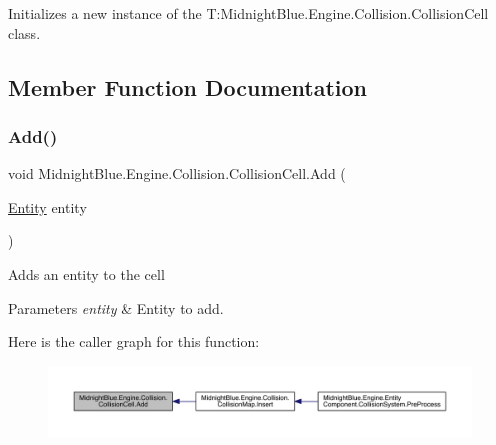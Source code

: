 Initializes a new instance of the T\+:\+Midnight\+Blue.\+Engine.\+Collision.\+Collision\+Cell class. 



\subsection{Member Function Documentation}
\hypertarget{class_midnight_blue_1_1_engine_1_1_collision_1_1_collision_cell_a6e7c40d82371e32cb18c5fb93e645dc8}{}\label{class_midnight_blue_1_1_engine_1_1_collision_1_1_collision_cell_a6e7c40d82371e32cb18c5fb93e645dc8} 
\subsubsection{\texorpdfstring{Add()}{Add()}}
{\footnotesize\ttfamily void Midnight\+Blue.\+Engine.\+Collision.\+Collision\+Cell.\+Add (\begin{DoxyParamCaption}\item[{\hyperlink{class_midnight_blue_1_1_engine_1_1_entity_component_1_1_entity}{Entity}}]{entity }\end{DoxyParamCaption})\hspace{0.3cm}{\ttfamily [inline]}}



Adds an entity to the cell 


\begin{DoxyParams}{Parameters}
{\em entity} & Entity to add.\\
\hline
\end{DoxyParams}
Here is the caller graph for this function\+:
\nopagebreak
\begin{figure}[H]
\begin{center}
\leavevmode
\includegraphics[width=350pt]{class_midnight_blue_1_1_engine_1_1_collision_1_1_collision_cell_a6e7c40d82371e32cb18c5fb93e645dc8_icgraph}
\end{center}
\end{figure}
\hypertarget{class_midnight_blue_1_1_engine_1_1_collision_1_1_collision_cell_ac4bfd3cfb6886ecf2d9553901516030d}{}\label{class_midnight_blue_1_1_engine_1_1_collision_1_1_collision_cell_ac4bfd3cfb6886ecf2d9553901516030d} 
